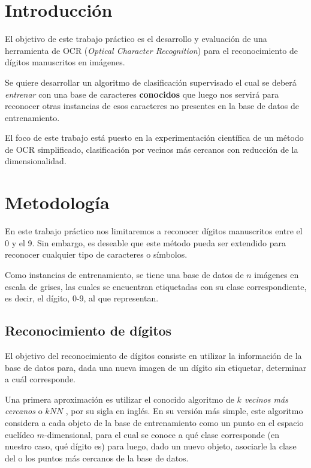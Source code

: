 \documentclass[11pt, a4paper]{article}
\newcommand{\kknn}{k}
\begin{document}


\section*{Introducción}

El objetivo de este trabajo práctico es el desarrollo y evaluación de una herramienta de OCR (\textit{Optical Character Recognition}) para el reconocimiento de dígitos manuscritos en imágenes.

Se quiere desarrollar un algoritmo de clasificación supervisado el cual se deberá \textit{entrenar} con una base de caracteres \textbf{conocidos} que luego nos servirá para reconocer otras instancias de esos caracteres no presentes en la base de datos de entrenamiento.


El foco de este trabajo está puesto en la experimentación científica de un método de OCR simplificado, clasificación por vecinos más cercanos con reducción de la dimensionalidad.


\section*{Metodología}

En este trabajo práctico nos limitaremos a reconocer dígitos manuscritos entre el 0 y el 9. Sin embargo, es  deseable que este método pueda ser extendido para reconocer cualquier tipo de caracteres o símbolos.

Como instancias de entrenamiento, se tiene una base de datos de $n$ imágenes en escala de grises, las cuales se encuentran etiquetadas con su clase correspondiente, es decir, el dígito, 0-9, al que representan. 

\subsection*{Reconocimiento de dígitos}

El objetivo del reconocimiento de dígitos consiste en utilizar la información de la base de datos para, dada una nueva imagen de un dígito sin etiquetar, determinar a cuál corresponde.


Una primera aproximación es utilizar el conocido algoritmo de \emph{$\kknn$ vecinos más cercanos} o $kNN$ \cite{duda2012pattern}, por su sigla en inglés. 
En su versión más simple, este algoritmo considera a cada objeto de la base de entrenamiento como un punto en el espacio euclídeo $m$-dimensional, para el cual se conoce a qué clase corresponde (en nuestro caso, qué dígito es) para luego, dado un nuevo objeto, asociarle la clase del o los puntos más cercanos de la base de datos. 
\end{document}
